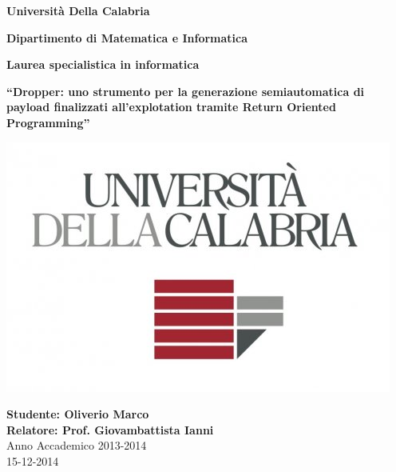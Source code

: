 \begin{titlepage}
    \begin{center}
        \vspace*{1cm}
        
        \Huge
        \textbf{Università Della Calabria}
        
        \vspace{0.2cm}
        \LARGE
        \textbf{Dipartimento di Matematica e Informatica} 

        \vspace{0.2cm}
        \LARGE
        \textbf{Laurea specialistica in informatica}

        \vspace{0.5cm} \Large \textbf{``Dropper: uno strumento per la
          generazione semiautomatica di payload finalizzati
          all'explotation tramite Return Oriented Programming''}
        
        \vspace{0.8cm}
        \includegraphics[scale=0.5]{unical}


        \vspace{1.5cm}        
        \large
        \textbf{Studente: Oliverio Marco} \\
        \textbf{Relatore: Prof. Giovambattista Ianni} \\        

        \vspace{1.0cm}
        \Large
        Anno Accademico 2013-2014\\
        15-12-2014
        
    \end{center}
\end{titlepage}
